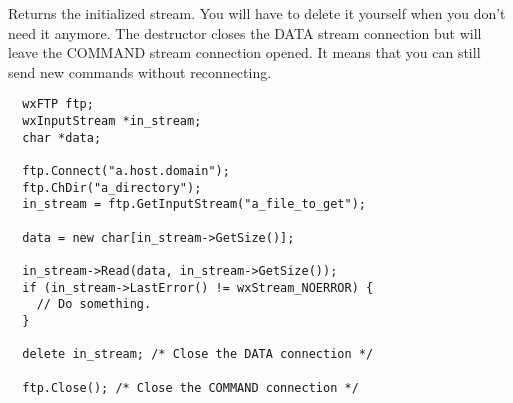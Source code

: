 Returns the initialized stream. You will have to delete it yourself when you
don't need it anymore. The destructor closes the DATA stream connection but
will leave the COMMAND stream connection opened. It means that you can still
send new commands without reconnecting.


\begin{verbatim}
  wxFTP ftp;
  wxInputStream *in_stream;
  char *data;

  ftp.Connect("a.host.domain");
  ftp.ChDir("a_directory");
  in_stream = ftp.GetInputStream("a_file_to_get");

  data = new char[in_stream->GetSize()];

  in_stream->Read(data, in_stream->GetSize());
  if (in_stream->LastError() != wxStream_NOERROR) {
    // Do something.
  }

  delete in_stream; /* Close the DATA connection */

  ftp.Close(); /* Close the COMMAND connection */
\end{verbatim}



